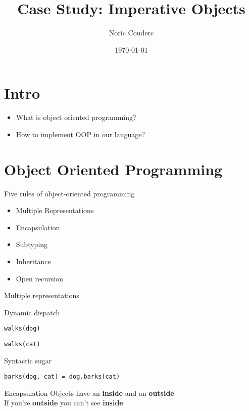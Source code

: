 \documentclass[presentation,xcolor=svgnames]{beamer}
\author{Noric Couderc}
\date{\today}
\title{Case Study: Imperative Objects}
\begin{document}
\maketitle

\section{Intro}
\begin{frame}
  \begin{itemize}
  \item What is object oriented programming?
  \item How to implement OOP in our language?
  \end{itemize}
\end{frame}

\section{Object Oriented Programming}


\begin{frame}{Five rules of object-oriented programming}
\begin{itemize}
\item Multiple Representations
\item Encapsulation
\item Subtyping
\item Inheritance
\item Open recursion
\end{itemize}
\end{frame}

\begin{frame}[fragile]{Multiple representations}
\begin{block}{Dynamic dispatch}
\begin{verbatim}
walks(dog)
\end{verbatim}
\begin{verbatim}
walks(cat)
\end{verbatim}
\end{block}

\begin{block}{Syntactic sugar}
\begin{verbatim}
barks(dog, cat) = dog.barks(cat)
\end{verbatim}
\end{block}
\end{frame}

\begin{frame}{Encapsulation}
  \centering
  Objects have an \textbf{inside} and an \textbf{outside}\\
  If you're \textbf{outside} you can't see \textbf{inside}
\end{frame}
\end{document}
